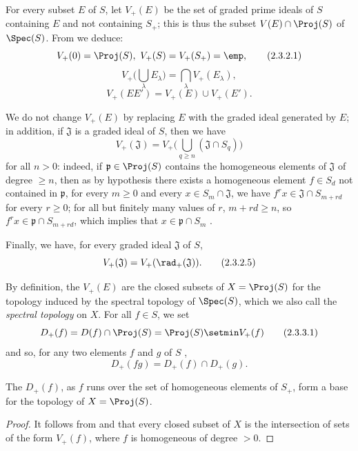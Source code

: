 \begin{env}[2.3.2]
\label{II.2.3.2}
For every subset $E$ of $S$, let $V_+(E)$ be the set of graded prime ideals of $S$ containing $E$ and not containing $S_+$;
this is thus the subset $V(E)\cap\Proj(S)$ of $\Spec(S)$.
From  we deduce:
\[
\label{II.2.3.2.1}
  V_+(0)=\Proj(S),\ V_+(S)=V_+(S_+)=\emp,
\tag{2.3.2.1}
\]
\[
\label{II.2.3.2.2}
  V_+\big(\textstyle\bigcup_\lambda E_\lambda\big)=\textstyle\bigcap_\lambda V_+(E_\lambda),
\tag{2.3.2.2}
\]
\[
\label{II.2.3.2.3}
  V_+(EE')=V_+(E)\cup V_+(E').
\tag{2.3.2.3}
\]

We do not change $V_+(E)$ by replacing $E$ with the graded ideal generated by $E$;
in addition, if $\mathfrak{J}$ is a graded ideal of $S$, then we have
\[
\label{II.2.3.2.4}
  V_+(\mathfrak{J})=V_+\big(\textstyle\bigcup_{q\geq n}(\mathfrak{J}\cap S_q)\big)
\tag{2.3.2.4}
\]
for all $n>0$: indeed, if $\mathfrak{p}\in\Proj(S)$ contains the homogeneous elements of $\mathfrak{J}$ of degree $\geq n$, then as by hypothesis there exists a homogeneous element $f\in S_d$ not contained in $\mathfrak{p}$, for every $m\geq 0$ and every $x\in S_m\cap\mathfrak{J}$, we have $f^r x\in\mathfrak{J}\cap S_{m+rd}$ for every $r\geq0$; for all but finitely many values of $r$, $m+rd\geq n$, so $f^r x\in\mathfrak{p}\cap S_{m+rd}$, which implies that $x\in\mathfrak{p}\cap S_m$ .

Finally, we have, for every graded ideal $\mathfrak{J}$ of $S$,
\[
  V_+(\mathfrak{J})=V_+(\rad_+(\mathfrak{J})).
\tag{2.3.2.5}
\]
\end{env}

\begin{env}[2.3.3]
\label{II.2.3.3}
By definition, the $V_+(E)$ are the closed subsets of $X=\Proj(S)$ for the topology induced by the spectral topology of $\Spec(S)$, which we also call the \emph{spectral topology} on $X$.
For all $f\in S$, we set
\[
\label{II.2.3.3.1}
  D_+(f) = D(f)\cap\Proj(S) = \Proj(S)\setmin V_+(f)
\tag{2.3.3.1}
\]
and so, for any two elements $f$ and $g$ of $S$ ,
\[
\label{II.2.3.3.2}
  D_+(fg) = D_+(f)\cap D_+(g).
\tag{2.3.3.2}
\]
\end{env}

\begin{proposition}[2.3.4]
\label{II.2.3.4}
The $D_+(f)$, as $f$ runs over the set of homogeneous elements of $S_+$, form a base for the topology of $X=\Proj(S)$.
\end{proposition}

\begin{proof}
It follows from  and  that every closed subset of $X$ is the intersection of sets of the form $V_+(f)$, where $f$ is homogeneous of degree $>0$.
\end{proof}

